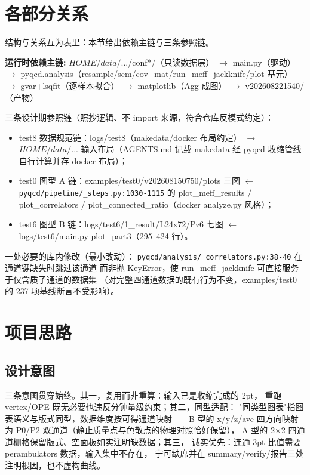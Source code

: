 \documentclass[UTF8]{ctexart}
\begin{document}
\section{各部分关系}
结构与关系互为表里：本节给出依赖主链与三条参照链。
\begin{keybox}
\textbf{运行时依赖主链:}
\textcolor{relation}{${HOME}/data/\ldots$/conf*/（只读数据层）
$\rightarrow$ main.py（驱动）
$\rightarrow$ pyqcd.analysis（resample/sem/cov\_mat/run\_meff\_jackknife/plot 基元）
$\rightarrow$ gvar+lsqfit（逐样本拟合）
$\rightarrow$ matplotlib（Agg 成图）
$\rightarrow$ v202608221540/（产物）}
\end{keybox}
三条设计期参照链（照抄逻辑、不 import 来源，符合仓库反模式约定）：
\begin{itemize}
\item \textcolor{relation}{test8 数据规范链}：logs/test8（makedata/docker 布局约定）
$\rightarrow$ ${HOME}/data/...$ 输入布局（AGENTS.md 记载 makedata 经 pyqcd 收缩管线自行计算并存 docker 布局）；
\item \textcolor{relation}{test0 图型 A 链}：examples/test0/v202608150750/plots 三图
$\leftarrow$ \texttt{\nolinkurl{pyqcd/pipeline/_steps.py:1030-1115}} 的 plot\_meff\_results /
plot\_correlators / plot\_connected\_ratio（docker analyze.py 风格）；
\item \textcolor{relation}{test6 图型 B 链}：logs/test6/1\_result/L24x72/Pz6 七图
$\leftarrow$ logs/test6/main.py plot\_part3（295--424 行）。
\end{itemize}
一处必要的库内修改（最小改动）：
\texttt{\nolinkurl{pyqcd/analysis/_correlators.py:38-40}} 在通道键缺失时跳过该通道
而非抛 KeyError，使 run\_meff\_jackknife 可直接服务于仅含质子通道的数据集
（对完整四通道数据的既有行为不变，examples/test0 的 237 项基线断言不受影响）。

\section{项目思路}
\subsection{设计意图}
三条意图贯穿始终。其一，\textcolor{idea}{复用而非重算}：输入已是收缩完成的 2pt，
重跑 vertex/OPE 既无必要也违反分钟量级约束；其二，\textcolor{idea}{同型适配}：
"同类型图表"指图表语义与版式同型，数据维度按可得通道映射——B 型的
x/y/z/ave 四方向映射为 P0/P2 双通道（静止质量点与色散点的物理对照恰好保留），
A 型的 2$\times$2 四通道栅格保留版式、空面板如实注明缺数据；其三，
\textcolor{idea}{诚实优先}：连通 3pt 比值需要 perambulators 数据，输入集中不存在，
宁可缺席并在 summary/verify/报告三处注明根因，也不虚构曲线。
\end{document}
